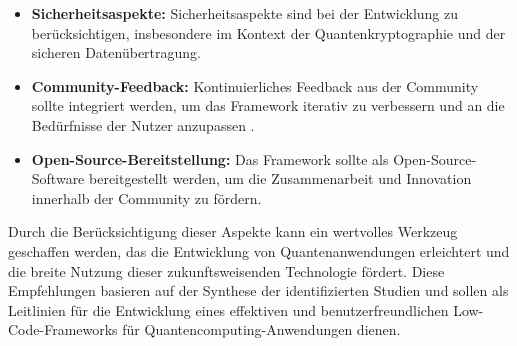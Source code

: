 \begin{itemize}
    \item \textbf{Sicherheitsaspekte:} Sicherheitsaspekte sind bei der Entwicklung zu berücksichtigen, insbesondere im Kontext der 
    Quantenkryptographie und der sicheren Datenübertragung.
    \item \textbf{Community-Feedback:} Kontinuierliches Feedback aus der Community sollte integriert werden, um das Framework iterativ 
    zu verbessern und an die Bedürfnisse der Nutzer anzupassen \cite{Ahmad_2023}.
    \item \textbf{Open-Source-Bereitstellung:} Das Framework sollte als Open-Source-Software bereitgestellt werden, um die 
    Zusammenarbeit und Innovation innerhalb der Community zu fördern.
\end{itemize}

Durch die Berücksichtigung dieser Aspekte kann ein wertvolles Werkzeug geschaffen werden, das die Entwicklung von Quantenanwendungen 
erleichtert und die breite Nutzung dieser zukunftsweisenden Technologie fördert. Diese Empfehlungen basieren auf der Synthese der 
identifizierten Studien und sollen als Leitlinien für die Entwicklung eines effektiven und benutzerfreundlichen Low-Code-Frameworks 
für Quantencomputing-Anwendungen dienen. 


